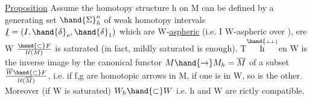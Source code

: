 \uline{Proposition} Assume the homotopy structure h on M can be defined by a
generating set $\hand{\Sigma}_h^o$ of weak homotopy intervals $\underline{I} =(I,\hand{\delta}_o,\hand{\delta}_1)$ which are
W-\uline{aspheric} (i.e. I W-aspheric over  ), ere W $\hand{\subset} F\over{l}{\ell}(M)$ is  saturated 
(in fact, mildly saturated is enough). T$\overset{\hand{\scriptscriptstyle\perp\perp}}{\mathrm h}$en W is the inverse image 
by the canonical functor $M \hand{\to} M_h = \overline{M}$ of a  subset $\overline{W} \hand{\subset} F\over{l}{\ell}(\overline{M})$, i.e.
 if f,g are homotopic arrows in M, if one is in W, so is the
other. Moreover (if W is saturated) $W_h \hand{\subset} W$ i.e. h and W are rictly
compatible.

